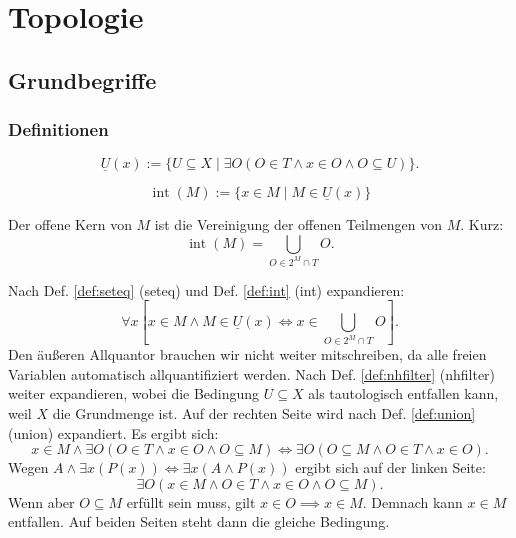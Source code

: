
\chapter{Topologie}
\section{Grundbegriffe}
\subsection{Definitionen}

\begin{Definition}%
\label{def:nhfilter}
\[\underline U(x) := \{U{\subseteq}X\mid
\exists O(O\in T\land x\in O\land O\subseteq U)\}.\]
\end{Definition}

\begin{Definition}
\label{def:int}
\[\operatorname{int}(M) := \{x\in M\mid M\in \underline U(x)\}\]
\end{Definition}

\begin{Satz}
Der offene Kern von $M$ ist die Vereinigung der offenen Teilmengen
von $M$. Kurz:%
\[\operatorname{int}(M) = \bigcup_{O\in 2^M\cap T} O.\]
\end{Satz}

\begin{Beweis}
Nach Def. \ref{def:seteq} (seteq) und Def. \ref{def:int} (int)
expandieren:
\[\forall x[x\in M\land M\in\underline U(x)
\iff x\in\bigcup_{O\in 2^M\cap T} O].\]
Den äußeren Allquantor brauchen wir nicht weiter mitschreiben, da alle
freien Variablen automatisch allquantifiziert werden.
Nach Def. \ref{def:nhfilter} (nhfilter) weiter expandieren, wobei die
Bedingung $U\subseteq X$ als tautologisch entfallen kann,
weil $X$ die Grundmenge ist. Auf der rechten Seite wird nach Def.
\ref{def:union} (union) expandiert. Es ergibt sich:
\[x\in M\land \exists O(O\in T\land x\in O\land O\subseteq M)
\iff \exists O(O\subseteq M\land O\in T\land x\in O).\]
Wegen $A\land\exists x(P(x))\iff \exists x(A\land P(x))$ ergibt
sich auf der linken Seite:
\[\exists O(x\in M\land O\in T\land x\in O\land O\subseteq M).\]
Wenn aber $O\subseteq M$ erfüllt sein muss, gilt
$x\in O\implies x\in M$. Demnach kann $x\in M$ entfallen.
Auf beiden Seiten steht dann die gleiche Bedingung.\,\qedsymbol
\end{Beweis}

